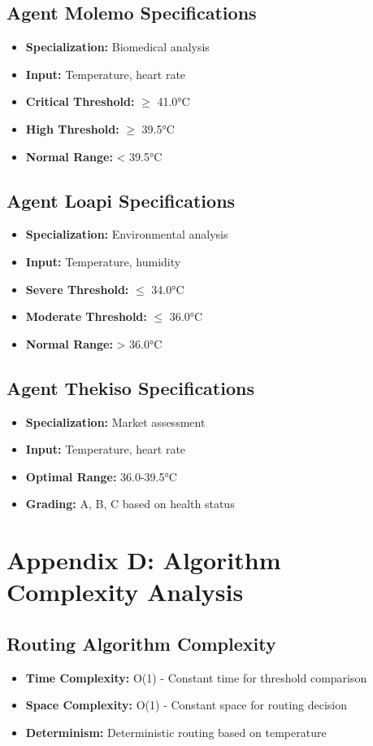 \subsection*{Agent Molemo Specifications}
\begin{itemize}
    \item \textbf{Specialization:} Biomedical analysis
    \item \textbf{Input:} Temperature, heart rate
    \item \textbf{Critical Threshold:} $\geq$ 41.0°C
    \item \textbf{High Threshold:} $\geq$ 39.5°C
    \item \textbf{Normal Range:} < 39.5°C
\end{itemize}

\subsection*{Agent Loapi Specifications}
\begin{itemize}
    \item \textbf{Specialization:} Environmental analysis
    \item \textbf{Input:} Temperature, humidity
    \item \textbf{Severe Threshold:} $\leq$ 34.0°C
    \item \textbf{Moderate Threshold:} $\leq$ 36.0°C
    \item \textbf{Normal Range:} > 36.0°C
\end{itemize}

\subsection*{Agent Thekiso Specifications}
\begin{itemize}
    \item \textbf{Specialization:} Market assessment
    \item \textbf{Input:} Temperature, heart rate
    \item \textbf{Optimal Range:} 36.0-39.5°C
    \item \textbf{Grading:} A, B, C based on health status
\end{itemize}

\section*{Appendix D: Algorithm Complexity Analysis}

\subsection*{Routing Algorithm Complexity}
\begin{itemize}
    \item \textbf{Time Complexity:} O(1) - Constant time for threshold comparison
    \item \textbf{Space Complexity:} O(1) - Constant space for routing decision
    \item \textbf{Determinism:} Deterministic routing based on temperature
\end{itemize}

